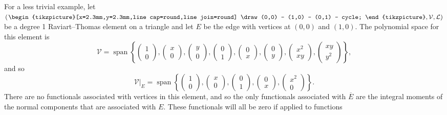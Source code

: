 \documentclass[sn-mathphys-num]{sn-jnl}%
\theoremstyle{thmstyleone}%
\newcommand{\closure}[1]{\overline{#1}}
\newcommand{\subentity}{E}
\newcommand{\polyspace}{\mathcal{V}}
\newcommand{\dualbasis}{\mathcal{L}}
\newcommand{\rtriangle}[1][1.5mm]{\hspace{1pt}\begin{tikzpicture}[x=#1,y=#1,line cap=round,line join=round]
    \draw (0,0) -- (1,0) -- (0,1) -- cycle;
\end{tikzpicture}}
\theoremstyle{thmstyletwo}%
\theoremstyle{thmstylethree}%
\begin{document}
For a less trivial example, let $(\rtriangle[2.3mm],\polyspace,\dualbasis)$ be a degree
1 Raviart--Thomas element \cite{rt} on a triangle and let $\subentity$ be the edge with
vertices at $(0,0)$ and $(1,0)$. The polynomial space for this element is
$$\polyspace=\operatorname{span}\left\{
\begin{pmatrix}1\\0\end{pmatrix},
\begin{pmatrix}x\\0\end{pmatrix},
\begin{pmatrix}y\\0\end{pmatrix},
\begin{pmatrix}0\\1\end{pmatrix},
\begin{pmatrix}0\\x\end{pmatrix},
\begin{pmatrix}0\\y\end{pmatrix},
\begin{pmatrix}x^2\\xy\end{pmatrix},
\begin{pmatrix}xy\\y^2\end{pmatrix}
\right\},$$
and so
$$\left.\polyspace\right|_{\subentity}=\operatorname{span}\left\{
\begin{pmatrix}1\\0\end{pmatrix},
\begin{pmatrix}x\\0\end{pmatrix},
\begin{pmatrix}0\\1\end{pmatrix},
\begin{pmatrix}0\\x\end{pmatrix},
\begin{pmatrix}x^2\\0\end{pmatrix}
\right\}.$$
There are no functionals associated with vertices in this element, and so the only functionals
associated with $\closure{\subentity}$ are the integral moments of the normal components
that are associated with $\subentity$. These functionals will all be zero if applied to functions
\end{document}
